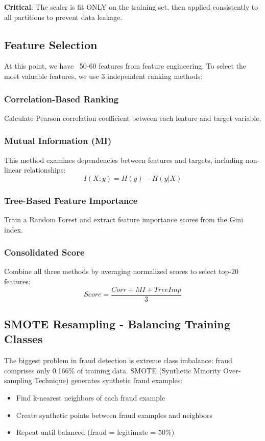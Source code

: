 \textbf{Critical}: The scaler is fit ONLY on the training set, then applied consistently to all partitions to prevent data leakage.

\subsection{Feature Selection}

At this point, we have ~50-60 features from feature engineering. To select the most valuable features, we use 3 independent ranking methods:

\subsubsection{Correlation-Based Ranking}

Calculate Pearson correlation coefficient between each feature and target variable.

\subsubsection{Mutual Information (MI)}

This method examines dependencies between features and targets, including non-linear relationships:
\[I(X; y) = H(y) - H(y|X)\]

\subsubsection{Tree-Based Feature Importance}

Train a Random Forest and extract feature importance scores from the Gini index.

\subsubsection{Consolidated Score}

Combine all three methods by averaging normalized scores to select top-20 features:
\[Score = \frac{Corr + MI + TreeImp}{3}\]

\subsection{SMOTE Resampling - Balancing Training Classes}

The biggest problem in fraud detection is extreme class imbalance: fraud comprises only 0.166\% of training data. SMOTE (Synthetic Minority Over-sampling Technique) generates synthetic fraud examples:
\begin{itemize}
    \item Find k-nearest neighbors of each fraud example
    \item Create synthetic points between fraud examples and neighbors
    \item Repeat until balanced (fraud = legitimate = 50\%)
\end{itemize}

